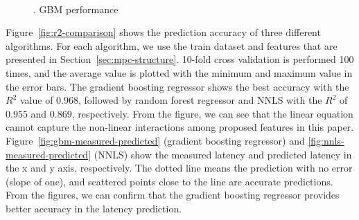 \documentclass[10pt, conference, compsocconf]{IEEEtran}
\begin{document}
\begin{figure}[t]
	\centering
	\\ 
	 \hfil 
	\caption{\label{fig:gbm-comparison}. GBM performance}
\end{figure}

Figure~\ref{fig:r2-comparison} shows the prediction accuracy of three different algorithms. For each algorithm, we use the train dataset and features that are presented in Section~\ref{sec:mpc-structure}. 10-fold cross validation is performed 100 times, and the average value is plotted with the minimum and maximum value in the error bars. The gradient boosting regressor shows the best accuracy with the $R^2$ value of $0.968$, followed by random forest regressor and NNLS with the $R^2$ of $0.955$ and $0.869$, respectively. From the figure, we can see that the linear equation cannot capture the non-linear interactions among proposed features in this paper. Figure~\ref{fig:gbm-measured-predicted} (gradient boosting regressor) and \ref{fig:nnls-measured-predicted} (NNLS) show the measured latency and predicted latency in the x and y axis, respectively. The dotted line means the prediction with no error (slope of one), and scattered points close to the line are accurate predictions. From the figures, we can confirm that the gradient boosting regressor provides better accuracy in the latency prediction.
\end{document}
